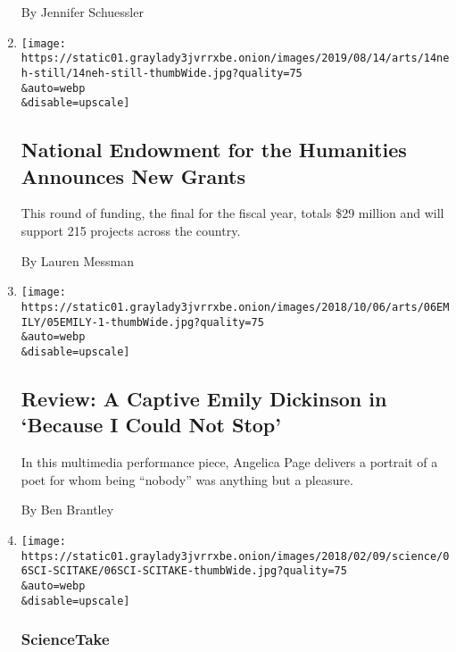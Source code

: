 \begin{enumerate}
  By Jennifer Schuessler
\item
  \href{/2019/08/14/arts/national-endowment-humanities-neh-grants.html}{}

  \texttt{[image: https://static01.graylady3jvrrxbe.onion/images/2019/08/14/arts/14neh-still/14neh-still-thumbWide.jpg?quality=75\\\&auto=webp\\\&disable=upscale]}

  \hypertarget{national-endowment-for-the-humanities-announces-new-grants}{%
  \subsection{National Endowment for the Humanities Announces New
  Grants}\label{national-endowment-for-the-humanities-announces-new-grants}}

  This round of funding, the final for the fiscal year, totals \$29
  million and will support 215 projects across the country.

  By Lauren Messman
\item
  \href{/2018/10/03/theater/because-i-could-not-stop-review-emily-dickinson.html}{}

  \texttt{[image: https://static01.graylady3jvrrxbe.onion/images/2018/10/06/arts/06EMILY/05EMILY-1-thumbWide.jpg?quality=75\\\&auto=webp\\\&disable=upscale]}

  \hypertarget{review-a-captive-emily-dickinson-in-because-i-could-not-stop}{%
  \subsection{Review: A Captive Emily Dickinson in `Because I Could Not
  Stop'}\label{review-a-captive-emily-dickinson-in-because-i-could-not-stop}}

  In this multimedia performance piece, Angelica Page delivers a
  portrait of a poet for whom being ``nobody'' was anything but a
  pleasure.

  By Ben Brantley
\item
  \href{/2018/02/06/science/snake-locomotion.html}{}

  \texttt{[image: https://static01.graylady3jvrrxbe.onion/images/2018/02/09/science/06SCI-SCITAKE/06SCI-SCITAKE-thumbWide.jpg?quality=75\\\&auto=webp\\\&disable=upscale]}

  \hypertarget{sciencetake}{%
  \subsubsection{ScienceTake}\label{sciencetake}}


\end{enumerate}
